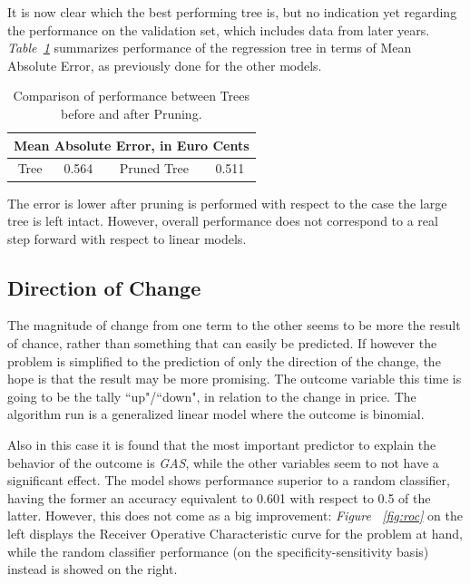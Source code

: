 \documentclass[a4paper,12pt]{book}
\begin{document}
It is now clear which the best performing tree is, but no indication yet regarding the performance on the validation set, which includes data from later years. \textit{Table~\ref{Tab:prune}} summarizes performance of the regression tree in terms of Mean Absolute Error, as previously done for the other models.

\begin{table}[tb]
\begin{center}
\begin{tabular}{|c|c|c|c|}
\hline
\multicolumn{4}{|c|}{Mean Absolute Error, in Euro Cents}\\
\hline
Tree&0.564&Pruned Tree&0.511\\
\hline
\end{tabular}
\caption{Comparison of performance between Trees before and after Pruning.}
\label{Tab:prune}
\end{center}
\end{table}

The error is lower after pruning is performed with respect to the case the large tree is left intact. However, overall performance does not correspond to a real step forward with respect to linear models.

\subsection{Direction of Change}

The magnitude of change from one term to the other seems to be more the result of chance, rather than something that can easily be predicted. If however the problem is simplified to the prediction of only the direction of the change, the hope is that the result may be more promising. The outcome variable this time is going to be the tally ``up"/``down", in relation to the change in price. The algorithm run is a generalized linear model where the outcome is binomial.

Also in this case it is found that the most important predictor to explain the behavior of the outcome is \textit{GAS}, while the other variables seem to not have a significant effect. The model shows performance superior to a random classifier, having the former an accuracy equivalent to 0.601 with respect to 0.5 of the latter. However, this does not come as a big improvement: \textit{Figure ~\ref{fig:roc}} on the left displays the Receiver Operative Characteristic curve for the problem at hand, while the random classifier performance (on the specificity-sensitivity basis) instead is showed on the right.
\end{document}
